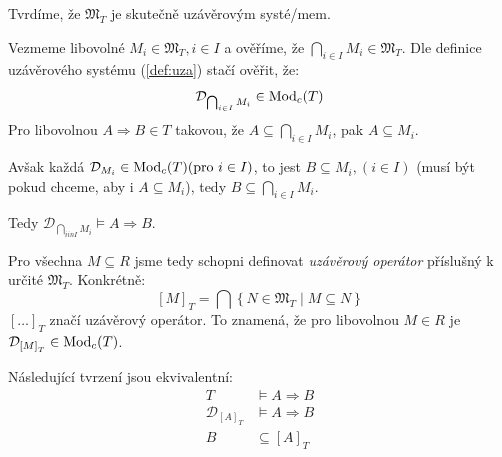 \begin{upquote}
Tvrdíme, že $\mathfrak{M}_{T}$ je skutečně uzávěrovým systé\-/mem. 
\end{upquote}

\begin{upproof}
Vezmeme libovolné $M_{i} \in \mathfrak{M}_{T}, i \in I$ a ověříme, že $\bigcap_{i \in I}M_{i} \in \mathfrak{M}_{T}$.
Dle definice uzávěrového systému (\ref{def:uza}) stačí ověřit, že:
$$
\mathcal{D}_{\bigcap_{i \in I} M_{i}} \in \operatorname{Mod}_{c}(T)
$$
Pro libovolnou $A \Rightarrow B \in T$ takovou, že $A \subseteq \bigcap_{i \in I} M_{i}$, pak $A \subseteq  M_{i}$.

Avšak každá $\mathcal{D}_{M_{i}} \in \operatorname{Mod}_{c}(T) (\text{pro }i \in I)$, to jest $B \subseteq M_{i}, (i \in I)$ (musí být pokud chceme, aby i $A \subseteq M_{i}$), tedy $B \subseteq \bigcap_{i \in I} M_{i}$.

Tedy $\mathcal{D}_{\bigcap_{i in I} M_{i}} \vDash A \Rightarrow B$.
\end{upproof}

\begin{uptheorem}
Pro všechna $M \subseteq R$ jsme tedy schopni definovat \textit{uzávěrový operátor} příslušný k určité $\mathfrak{M}_{T}$. Konkrétně:
$$
\left[ M \right]_{T} = \bigcap \left\{ N \in \mathfrak{M}_{T} \; | \; M \subseteq N \right\}
$$
$\left[ \ldots \right]_{T}$ značí uzávěrový operátor. To znamená, že pro libovolnou $M \in R$ je $\mathcal{D}_{\left[ M \right]_{T}} \in \operatorname{Mod}_{c}(T)$.
\end{uptheorem}

\begin{upquote}\label{quot:dalsi}
Následující tvrzení jsou ekvivalentní:
\begin{align}
T &\vDash A \Rightarrow B \label{eq:1} \\
\mathcal{D}_{\left[ A \right]_{T}} &\vDash A \Rightarrow B \label{eq:2} \\
B &\subseteq \left[ A \right]_{T}\label{eq:3}
\end{align}
\end{upquote}

